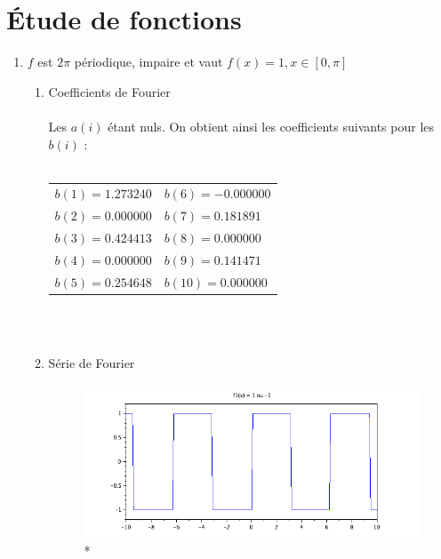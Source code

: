 \documentclass[a4paper,12pt]{report}
\begin{document}
	\section{\'Etude de fonctions}
	\begin{enumerate}
		\item $f$ est $2\pi$ p\'eriodique, impaire et vaut $f(x)=1, x \in [0,\pi]$\\
		\begin{enumerate}
			\item Coefficients de Fourier \\ \\
			Les $a(i)$ \'etant nuls. On obtient ainsi les coefficients suivants pour les $b(i)$ : \\ \\
			\begin{centering}
				\begin{tabular}{l l}
					$b(1) = 1.273240$ & \hspace*{2cm}$b(6) = -0.000000$\\
					$b(2) = 0.000000$ & \hspace*{2cm}$b(7) = 0.181891$\\
					$b(3) = 0.424413$ & \hspace*{2cm}$b(8) = 0.000000$\\
					$b(4) = 0.000000$ & \hspace*{2cm}$b(9) = 0.141471$\\
					$b(5) = 0.254648$ & \hspace*{2cm}$b(10) = 0.000000$\\
				\end{tabular}
			\end{centering}\\ \\
			\item S\'erie de Fourier
			\begin{figure}[h!]
				\centering
				\includegraphics[scale=0.6]{ex1_fig1_0.png}\\*

\end{figure}
\end{enumerate}
\end{enumerate}
\end{document}
